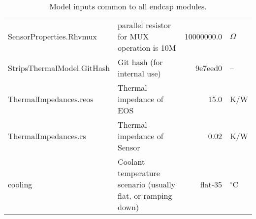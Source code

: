 \begin{table}[ht]
\begin{centering}
{\begin{tabular}{|l|l|r|l|}
SensorProperties.Rhvmux              & parallel resistor for MUX operation is 10M                   & 10000000.0 & $\Omega$    \\ 
StripsThermalModel.GitHash           & Git hash (for internal use)                                  &    9e7eed0 & --          \\ 
ThermalImpedances.reos               & Thermal impedance of EOS                                     &       15.0 & K/W         \\ 
ThermalImpedances.rs                 & Thermal impedance of Sensor                                  &       0.02 & K/W         \\ 
cooling                              & Coolant temperature scenario (usually flat, or ramping down) &    flat-35 & $^{\circ}$C \\ 
\hline\end{tabular}
} %
\end{centering}
\caption{Model inputs common to all endcap modules.}
\end{table}


